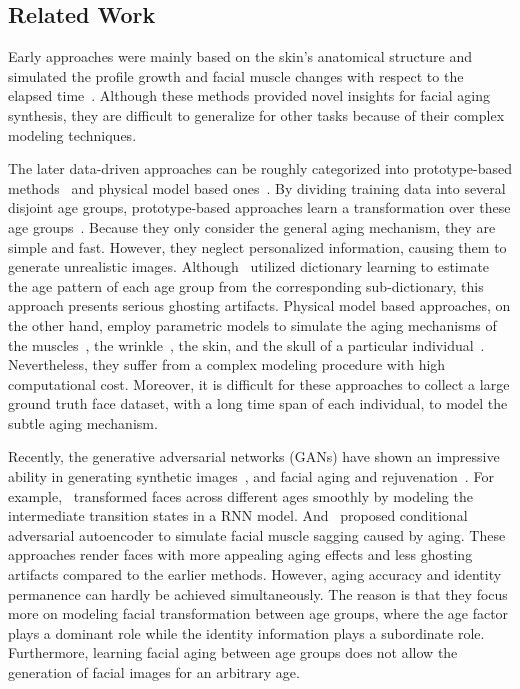 \documentclass{article}
\begin{document}
\subsection{Related Work}

Early approaches were mainly based on the skin's anatomical structure and simulated the profile growth and facial muscle changes with respect to the elapsed time~\cite{ramanathan2008modeling}. Although these methods provided novel insights for facial aging synthesis, they are difficult to generalize for other tasks because of their complex modeling techniques. 

The later data-driven approaches can be roughly categorized into prototype-based methods~\cite{tiddeman2001prototyping,kemelmacher2014illumination,shu2015personalized} and physical model based ones~\cite{suo2010compositional,park2010age,suo2012concatenational}. By dividing training data into several disjoint age groups, prototype-based approaches learn a transformation over these age groups~\cite{burt1995perception,kemelmacher2014illumination}. Because they only consider the general aging mechanism, they are simple and fast. However, they neglect personalized information, causing them to generate unrealistic images. Although~\cite{shu2015personalized} utilized dictionary learning to estimate the age pattern of each age group from the corresponding sub-dictionary, this approach presents serious ghosting artifacts. Physical model based approaches, on the other hand, employ parametric models to simulate the aging mechanisms of the muscles~\cite{suo2012concatenational}, the wrinkle~\cite{ramanathan2008modeling,suo2010compositional}, the skin, and the skull of a particular individual~\cite{lanitis2002toward,ramanathan2006modeling}.  
Nevertheless, they suffer from a complex modeling procedure with high computational cost. Moreover, it is difficult for these approaches to collect a large ground truth face dataset, with a long time span of each individual, to model the subtle aging mechanism. 

Recently, the generative adversarial networks (GANs) have shown an impressive ability in generating synthetic images~\cite{goodfellow2014generative,gauthier2014conditional,radford2015unsupervised}, and facial aging and rejuvenation~\cite{wang2016recurrent,duong2017temporal,zhang2017age,yang2017learning}. For example,~\cite{wang2016recurrent} transformed faces across different ages smoothly by modeling the intermediate transition states in a RNN model. And~\cite{zhang2017age} proposed conditional adversarial autoencoder to simulate facial muscle sagging caused by aging. These approaches render faces with more appealing aging effects and less ghosting artifacts compared to the earlier methods. However, aging accuracy and identity permanence can hardly be achieved simultaneously. The reason is that they focus more on modeling facial transformation between age groups, where the age factor plays a dominant role while the identity information plays a subordinate role. Furthermore, learning facial aging between age groups does not allow the generation of facial images for an arbitrary age.
\end{document}
